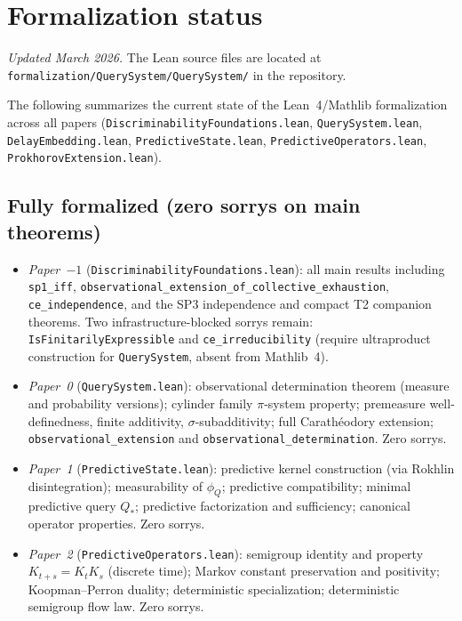 \documentclass[11pt]{article}
\begin{document}
\section{Formalization status}

\emph{Updated March 2026.}  The Lean source files are located at
\texttt{formalization/QuerySystem/QuerySystem/} in the repository.

The following summarizes the current state of the Lean~4/Mathlib
formalization across all papers
(\texttt{DiscriminabilityFoundations.lean}, \texttt{QuerySystem.lean},
\texttt{DelayEmbedding.lean}, \texttt{PredictiveState.lean},
\texttt{PredictiveOperators.lean}, \texttt{ProkhorovExtension.lean}).

\subsection*{Fully formalized (zero sorrys on main theorems)}

\begin{itemize}
  \item \emph{Paper~$-1$} (\texttt{DiscriminabilityFoundations.lean}):
        all main results including \texttt{sp1\_iff},
        \texttt{observational\_extension\_of\_collective\_exhaustion},
        \texttt{ce\_independence}, and the SP3 independence and compact
        T2 companion theorems.  Two infrastructure-blocked sorrys remain:
        \texttt{IsFinitarilyExpressible} and \texttt{ce\_irreducibility}
        (require ultraproduct construction for \texttt{QuerySystem},
        absent from Mathlib~4).

  \item \emph{Paper~0} (\texttt{QuerySystem.lean}):
        observational determination theorem (measure and probability
        versions); cylinder family $\pi$-system property; premeasure
        well-definedness, finite additivity, $\sigma$-subadditivity;
        full Carath\'eodory extension; \texttt{observational\_extension}
        and \texttt{observational\_determination}.  Zero sorrys.

  \item \emph{Paper~1} (\texttt{PredictiveState.lean}):
        predictive kernel construction (via Rokhlin disintegration);
        measurability of $\phi_Q$; predictive compatibility; minimal
        predictive query $Q_*$; predictive factorization and sufficiency;
        canonical operator properties.  Zero sorrys.

  \item \emph{Paper~2} (\texttt{PredictiveOperators.lean}):
        semigroup identity and property $K_{t+s}=K_t K_s$ (discrete time);
        Markov constant preservation and positivity; Koopman--Perron
        duality; deterministic specialization; deterministic semigroup
        flow law.  Zero sorrys.
\end{itemize}
\end{document}
